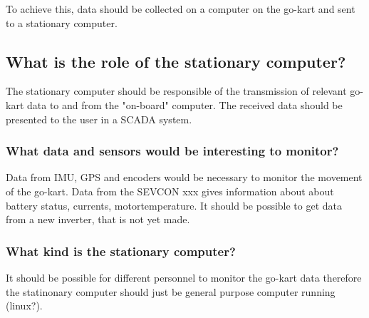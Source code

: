 To achieve this, data should be collected on a computer on the go-kart and sent to a stationary computer.



\subsection{What is the role of the stationary computer?}
The stationary computer should be responsible of the transmission of relevant go-kart data to and from the "on-board" computer.
The received data should be presented to the user in a SCADA system.

\subsubsection*{What data and sensors would be interesting to monitor?}
Data from IMU, GPS and encoders would be necessary to monitor the movement of the go-kart.
Data from the SEVCON xxx gives information about about battery status, currents, motortemperature.
It should be possible to get data from a new inverter, that is not yet made. 

\subsubsection*{What kind is the stationary computer?}
It should be possible for different personnel to monitor the go-kart data therefore the statinonary computer should just be general purpose computer running (linux?).

